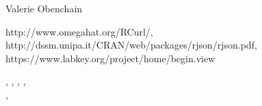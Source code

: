 \documentclass{book}
\begin{document}
\begin{Author}\relax
Valerie Obenchain
\end{Author}
\begin{References}\relax
http://www.omegahat.org/RCurl/,\\
http://dssm.unipa.it/CRAN/web/packages/rjson/rjson.pdf,\\
https://www.labkey.org/project/home/begin.view
\end{References}
\begin{SeeAlso}\relax
{}, , , 
, \\
, 
\end{SeeAlso}
\end{document}
